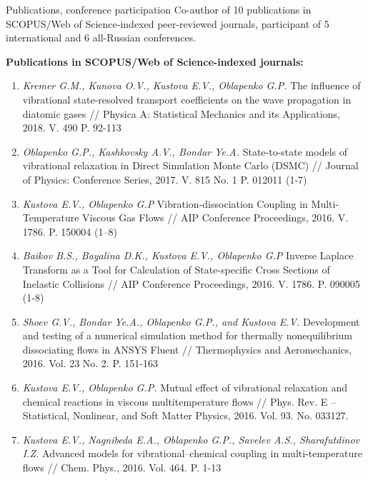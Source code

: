 \documentclass{resume} %
\begin{document}
\begin{rSection}{Publications, conference participation}
Co-author of 10 publications in SCOPUS/Web of Science-indexed peer-reviewed journals, participant of 5 international and 6 all-Russian conferences.

{\bf Publications in SCOPUS/Web of Science-indexed journals:}

\begin{enumerate}
\item \emph{Kremer G.M., Kunova O.V., Kustova E.V., Oblapenko G.P.} The influence of vibrational state-resolved transport coefficients on the wave propagation in diatomic gases // Physica A: Statistical Mechanics and its Applications, 2018. V. 490 P. 92-113

\item \emph{Oblapenko G.P., Kashkovsky A.V., Bondar Ye.A.} State-to-state models of vibrational relaxation in Direct Simulation Monte Carlo (DSMC) // Journal of Physics: Conference Series, 2017. V. 815 No. 1 P. 012011 (1-7)

\item  \emph{Kustova E.V., Oblapenko G.P} Vibration-dissociation Coupling in Multi-Temperature Viscous Gas Flows // AIP Conference Proceedings, 2016. V. 1786. P. 150004 (1–8)

\item  \emph{Baikov B.S., Bayalina D.K., Kustova E.V., Oblapenko G.P} Inverse Laplace Transform as a Tool for Calculation of State-specific Cross Sections of Inelastic Collisions // AIP Conference Proceedings, 2016. V. 1786. P. 090005 (1-8)

\item  \emph{Shoev G.V., Bondar Ye.A., Oblapenko G.P., and Kustova E.V.} Development and testing of a numerical simulation method for thermally nonequilibrium dissociating flows in ANSYS Fluent // Thermophysics and Aeromechanics, 2016. Vol. 23 No. 2. P. 151-163

\item  \emph{Kustova E.V., Oblapenko G.P.} Mutual effect of vibrational relaxation and chemical reactions in viscous multitemperature flows // Phys. Rev. E -- Statistical, Nonlinear, and Soft Matter Physics, 2016. Vol. 93. No. 033127.

\item  \emph{Kustova E.V., Nagnibeda E.A., Oblapenko G.P., Savelev A.S., Sharafutdinov I.Z.} Advanced models for vibrational–chemical coupling in multi-temperature flows // Chem. Phys., 2016. Vol. 464. P. 1-13


\end{enumerate}
\end{rSection}
\end{document}

